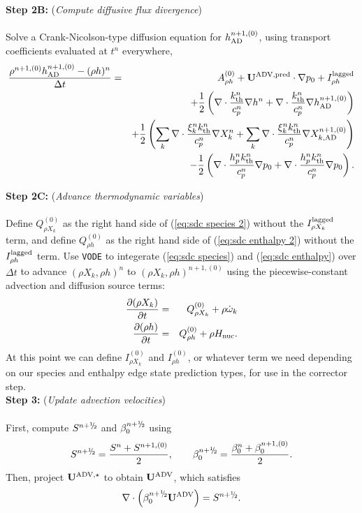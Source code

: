 {\bf Step 2B:} ({\it Compute diffusive flux divergence})\\ \\
Solve a Crank-Nicolson-type diffusion equation for $h^{n+1,(0)}_{\rm AD}$, using transport coefficients evaluated at $t^n$ everywhere,
\begin{eqnarray}
\frac{\rho^{n+1,(0)}h^{n+1,(0)}_{\rm AD} - (\rho h)^n}{\Delta t} &=& A_{\rho h}^{(0)} + \mathbf{U}^{\mathrm{ADV},\mathrm{pred}}\cdot\nabla p_0 + I_{\rho h}^{\rm lagged}\nonumber\\
&& + \frac{1}{2}\left(\nabla\cdot\frac{k_{\rm th}^n}{c_p^n}\nabla h^n + \nabla\cdot\frac{k_{\rm th}^n}{c_p^n}\nabla h_{\rm AD}^{n+1,(0)}\right)\nonumber\\
&& + \frac{1}{2}\left(\sum_k\nabla\cdot\frac{\xi_k^n k_{\rm th}^n}{c_p^n}\nabla X_k^n + \sum_k\nabla\cdot\frac{\xi_k^n k_{\rm th}^n}{c_p^n}\nabla X_{k,{\rm AD}}^{n+1,(0)}\right)\nonumber\\
&& - \frac{1}{2}\left(\nabla\cdot\frac{h_p^n k_{\rm th}^n}{c_p^n}\nabla p_0 + \nabla\cdot\frac{h_p^n k_{\rm th}^n}{c_p^n}\nabla p_0\right).\label{eq:sdc enthalpy 2}
\end{eqnarray}

{\bf Step 2C:} ({\it Advance thermodynamic variables})\\ \\
Define $Q_{\rho X_k}^{(0)}$ as the right hand side of (\ref{eq:sdc species 2}) without the $I_{\rho X_k}^{\rm lagged}$ term, and define $Q_{\rho h}^{(0)}$ as the right hand side of (\ref{eq:sdc enthalpy 2}) without the $I_{\rho h}^{\rm lagged}$ term.  Use {\tt VODE} to integerate (\ref{eq:sdc species}) and (\ref{eq:sdc enthalpy}) over $\Delta t$ to advance $(\rho X_k, \rho h)^n$ to $(\rho X_k, \rho h)^{n+1,(0)}$ using the piecewise-constant advection and diffusion source terms:
\begin{eqnarray}
\frac{\partial(\rho X_k)}{\partial t} &=& Q_{\rho X_k}^{(0)} + \rho\dot\omega_k\\
\frac{\partial(\rho h)}{\partial t} &=& Q_{\rho h}^{(0)} + \rho{H_{\rm nuc}}.
\end{eqnarray}
At this point we can define $I_{\rho X_k}^{(0)}$ and $I_{\rho h}^{(0)}$, or whatever term we need depending on our species and enthalpy edge state prediction types, for use in the corrector step.\\

{\bf Step 3:} ({\it Update advection velocities})\\ \\
First, compute $S^{n+\myhalf}$ and $\beta_0^{n+\myhalf}$ using
\begin{equation}
S^{n+\myhalf} = \frac{S^n + S^{n+1,(0)}}{2}, \qquad \beta_0^{n+\myhalf} = \frac{\beta_0^n + \beta_0^{n+1,(0)}}{2}.
\end{equation}
Then, project $\mathbf{U}^{\mathrm{ADV},\star}$ to obtain $\mathbf{U}^{\mathrm{ADV}}$, which satisfies
\begin{equation}
\nabla\cdot\left(\beta_0^{n+\myhalf}\uadvsdc\right) = S^{n+\myhalf}.
\end{equation}

